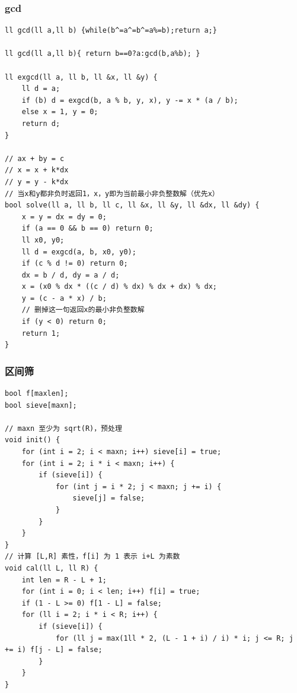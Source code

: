 \documentclass[twoside]{article}
\begin{document}
\subsubsection{gcd}
\begin{lstlisting}
ll gcd(ll a,ll b) {while(b^=a^=b^=a%=b);return a;}

ll gcd(ll a,ll b){ return b==0?a:gcd(b,a%b); }

ll exgcd(ll a, ll b, ll &x, ll &y) {
    ll d = a;
    if (b) d = exgcd(b, a % b, y, x), y -= x * (a / b);
    else x = 1, y = 0;
    return d;
}

// ax + by = c
// x = x + k*dx
// y = y - k*dx
// 当x和y都非负时返回1，x，y即为当前最小非负整数解（优先x）
bool solve(ll a, ll b, ll c, ll &x, ll &y, ll &dx, ll &dy) {
    x = y = dx = dy = 0;
    if (a == 0 && b == 0) return 0;
    ll x0, y0;
    ll d = exgcd(a, b, x0, y0);
    if (c % d != 0) return 0;
    dx = b / d, dy = a / d;
    x = (x0 % dx * ((c / d) % dx) % dx + dx) % dx;
    y = (c - a * x) / b;
    // 删掉这一句返回x的最小非负整数解
    if (y < 0) return 0;
    return 1;
}\end{lstlisting}
\subsubsection{区间筛}
\begin{lstlisting}
bool f[maxlen];
bool sieve[maxn];

// maxn 至少为 sqrt(R)，预处理
void init() {
    for (int i = 2; i < maxn; i++) sieve[i] = true;
    for (int i = 2; i * i < maxn; i++) {
        if (sieve[i]) {
            for (int j = i * 2; j < maxn; j += i) {
                sieve[j] = false;
            }
        }
    }
}
// 计算 [L,R] 素性，f[i] 为 1 表示 i+L 为素数
void cal(ll L, ll R) {
    int len = R - L + 1;
    for (int i = 0; i < len; i++) f[i] = true;
    if (1 - L >= 0) f[1 - L] = false;
    for (ll i = 2; i * i < R; i++) {
        if (sieve[i]) {
            for (ll j = max(1ll * 2, (L - 1 + i) / i) * i; j <= R; j += i) f[j - L] = false;
        }
    }
}\end{lstlisting}
\end{document}
